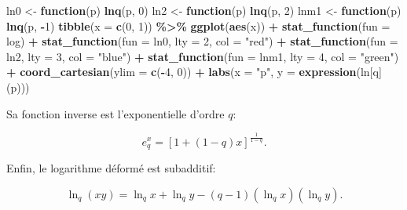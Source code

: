 \documentclass[
  11pt,
  american,
  a4paper,
  extrafontsizes,onecolumn,openright
  ]{memoir}
\newenvironment{Shaded}{\begin{snugshade}}{\end{snugshade}}
\newcommand{\AttributeTok}[1]{\textcolor[rgb]{0.13,0.29,0.53}{#1}}
\newcommand{\ControlFlowTok}[1]{\textcolor[rgb]{0.13,0.29,0.53}{\textbf{#1}}}
\newcommand{\DecValTok}[1]{\textcolor[rgb]{0.00,0.00,0.81}{#1}}
\newcommand{\FunctionTok}[1]{\textcolor[rgb]{0.13,0.29,0.53}{\textbf{#1}}}
\newcommand{\NormalTok}[1]{#1}
\newcommand{\OtherTok}[1]{\textcolor[rgb]{0.56,0.35,0.01}{#1}}
\newcommand{\SpecialCharTok}[1]{\textcolor[rgb]{0.81,0.36,0.00}{\textbf{#1}}}
\newcommand{\StringTok}[1]{\textcolor[rgb]{0.31,0.60,0.02}{#1}}
\begin{document}
\begin{Shaded}
\begin{Highlighting}[]
\NormalTok{ln0 }\OtherTok{\textless{}{-}} \ControlFlowTok{function}\NormalTok{(p) }\FunctionTok{lnq}\NormalTok{(p, }\DecValTok{0}\NormalTok{)}
\NormalTok{ln2 }\OtherTok{\textless{}{-}} \ControlFlowTok{function}\NormalTok{(p) }\FunctionTok{lnq}\NormalTok{(p, }\DecValTok{2}\NormalTok{)}
\NormalTok{lnm1 }\OtherTok{\textless{}{-}} \ControlFlowTok{function}\NormalTok{(p) }\FunctionTok{lnq}\NormalTok{(p, }\SpecialCharTok{{-}}\DecValTok{1}\NormalTok{)}
\FunctionTok{tibble}\NormalTok{(}\AttributeTok{x =} \FunctionTok{c}\NormalTok{(}\DecValTok{0}\NormalTok{, }\DecValTok{1}\NormalTok{)) }\SpecialCharTok{\%\textgreater{}\%} 
  \FunctionTok{ggplot}\NormalTok{(}\FunctionTok{aes}\NormalTok{(x)) }\SpecialCharTok{+} 
    \FunctionTok{stat\_function}\NormalTok{(}\AttributeTok{fun =}\NormalTok{ log) }\SpecialCharTok{+}
    \FunctionTok{stat\_function}\NormalTok{(}\AttributeTok{fun =}\NormalTok{ ln0, }\AttributeTok{lty =} \DecValTok{2}\NormalTok{, }\AttributeTok{col =} \StringTok{"red"}\NormalTok{) }\SpecialCharTok{+}
    \FunctionTok{stat\_function}\NormalTok{(}\AttributeTok{fun =}\NormalTok{ ln2, }\AttributeTok{lty =} \DecValTok{3}\NormalTok{, }\AttributeTok{col =} \StringTok{"blue"}\NormalTok{) }\SpecialCharTok{+}
    \FunctionTok{stat\_function}\NormalTok{(}\AttributeTok{fun =}\NormalTok{ lnm1, }\AttributeTok{lty =} \DecValTok{4}\NormalTok{, }\AttributeTok{col =} \StringTok{"green"}\NormalTok{) }\SpecialCharTok{+}
    \FunctionTok{coord\_cartesian}\NormalTok{(}\AttributeTok{ylim =} \FunctionTok{c}\NormalTok{(}\SpecialCharTok{{-}}\DecValTok{4}\NormalTok{, }\DecValTok{0}\NormalTok{)) }\SpecialCharTok{+}
    \FunctionTok{labs}\NormalTok{(}\AttributeTok{x =} \StringTok{"p"}\NormalTok{, }\AttributeTok{y =} \FunctionTok{expression}\NormalTok{(ln[q](p)))}
\end{Highlighting}
\end{Shaded}

\normalsize

Sa fonction inverse est l'exponentielle d'ordre \(q\):

\begin{equation}
  \label{eq:expq}
  e^x_q = \left[ 1 + \left( 1 - q \right) x \right]^{\frac{1}{1 - q}}.
\end{equation}

Enfin, le logarithme déformé est subadditif:

\begin{equation}
  \label{eq:lnqsubadd}
  \ln_q\left( xy \right)
  = \ln_q{x} + \ln_q{y} 
    - \left( q - 1 \right) \left( \ln_q{x} \right) \left( \ln_q{y} \right).
\end{equation}
\end{document}
